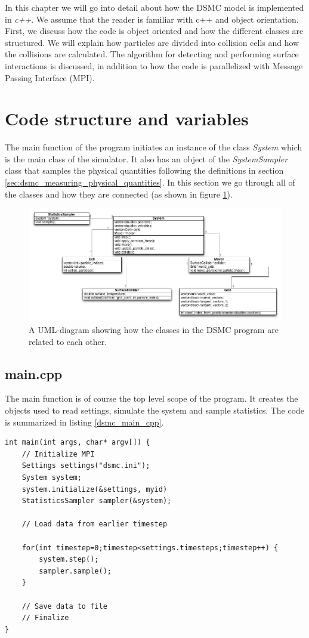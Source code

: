 In this chapter we will go into detail about how the DSMC model is implemented in \textit{c++}. We assume that the reader is familiar with c++ and object orientation. First, we discuss how the code is object oriented and how the different classes are structured. We will explain how particles are divided into collision cells and how the collisions are calculated. The algorithm for detecting and performing surface interactions is discussed, in addition to how the code is parallelized with Message Passing Interface (MPI). 
\section{Code structure and variables}
The main function of the program initiates an instance of the class \textit{System} which is the main class of the simulator. It also has an object of the \textit{SystemSampler} class that samples the physical quantities following the definitions in section \ref{sec:dsmc_measuring_physical_quantities}. In this section we go through all of the classes and how they are connected (as shown in figure \ref{fig:dsmc_uml_diagram}). 
\begin{figure}[h]
\begin{center}
\includegraphics[width=\textwidth, trim=0cm 0cm 0cm 0cm, clip]{DSMC/figures/dsmcuml.png}
\end{center}
\caption{A UML-diagram showing how the classes in the DSMC program are related to each other.}
\label{fig:dsmc_uml_diagram}
\end{figure}
\subsection{main.cpp}
The main function is of course the top level scope of the program. It creates the objects used to read settings, simulate the system and sample statistics. The code is summarized in listing \ref{dsmc_main_cpp}.
\begin{lstlisting}[caption=main.cpp, label=lst:dsmc_main_cpp]
int main(int args, char* argv[]) {
    // Initialize MPI
    Settings settings("dsmc.ini");
    System system;
    system.initialize(&settings, myid)
    StatisticsSampler sampler(&system);
    
    // Load data from earlier timestep

    for(int timestep=0;timestep<settings.timesteps;timestep++) {
    	system.step();
    	sampler.sample();
    }

    // Save data to file
    // Finalize
}
\end{lstlisting}
